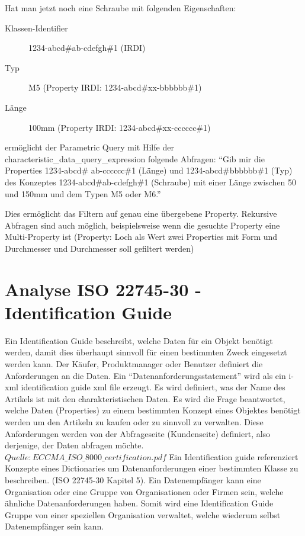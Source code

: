 Hat man jetzt noch eine Schraube mit folgenden Eigenschaften:
\begin{description}
\item[Klassen-Identifier] 1234-abcd\#ab-cdefgh\#1 (IRDI)
\item[Typ] M5 (Property IRDI: 1234-abcd\#xx-bbbbbb\#1)
\item[Länge] 100mm (Property IRDI: 1234-abcd\#xx-cccccc\#1)
\end{description}

ermöglicht der Parametric Query mit Hilfe der characteristic\_data\_query\_expression folgende Abfragen:  \enquote{Gib mir die Properties 1234-abcd\# ab-cccccc\#1 (Länge) und 1234-abcd\#bbbbbb\#1 (Typ) des Konzeptes 1234-abcd\#ab-cdefgh\#1 (Schraube) mit einer Länge zwischen 50 und 150mm und dem Typen M5 oder M6.}

Dies ermöglicht das Filtern auf genau eine übergebene Property. Rekursive Abfragen sind auch möglich, beispielsweise wenn die gesuchte Property eine Multi-Property ist (Property: Loch als Wert zwei Properties mit Form und Durchmesser und Durchmesser soll gefiltert werden)

\section{Analyse ISO 22745-30 - Identification Guide}\label{kap:identification_guide_anhang}

Ein Identification Guide beschreibt, welche Daten für ein Objekt benötigt werden, damit dies überhaupt sinnvoll für einen bestimmten Zweck eingesetzt werden kann. Der Käufer, Produktmanager oder Benutzer definiert die Anforderungen an die Daten. Ein  \enquote{Datenanforderungsstatement} wird als ein i-xml identification guide xml file erzeugt. Es wird definiert, was der Name des Artikels ist mit den charakteristischen Daten. Es wird die Frage beantwortet, welche Daten (Properties) zu einem bestimmten Konzept eines Objektes benötigt werden um den Artikeln zu kaufen oder zu sinnvoll zu verwalten. Diese Anforderungen werden von der Abfrageseite (Kundenseite) definiert, also derjenige, der Daten abfragen möchte. \(Quelle: ECCMA\_ISO\_8000\_certification.pdf\) 
Ein Identification guide referenziert Konzepte eines Dictionaries um Datenanforderungen einer bestimmten Klasse zu beschreiben. (ISO 22745-30 Kapitel 5). 
Ein Datenempfänger kann eine Organisation oder eine Gruppe von Organisationen oder Firmen sein, welche ähnliche Datenanforderungen haben. Somit wird eine Identification Guide Gruppe von einer speziellen Organisation verwaltet, welche wiederum selbst Datenempfänger sein kann.  

